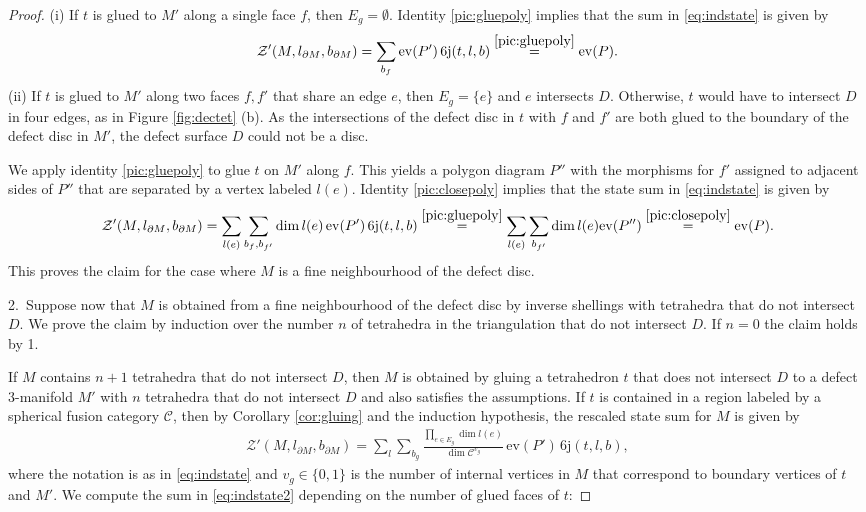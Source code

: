 \documentclass[1.5pt, a4paper]{article}
\newcommand{\mac}{\mathcal C}
\newcommand{\ev}{\mathrm{ev}}
\begin{document}
\begin{proof}
 (i) If $t$ is glued to $M'$ along a single face $f$, then $E_g=\emptyset$.  
Identity \eqref{pic:gluepoly}  implies that the sum in \eqref{eq:indstate} is given by
$$\mathcal Z'(M, l_{\partial M}, b_{\partial M})=\sum_{b_f} \ev(P')\, \mathrm{6j}(t,l,b)\stackrel{\eqref{pic:gluepoly}}=\ev(P).$$
(ii) If $t$ is glued to $M'$ along two faces $f,f'$ that share an edge $e$, then $E_g=\{e\}$ and $e$ intersects $D$.  Otherwise, $t$ would have to intersect 
$D$ in four edges, as in Figure \ref{fig:dectet} (b). As the intersections of the defect disc in $t$ with $f$ and $f'$ are both glued to the boundary of the defect disc in $M'$, 
the defect surface $D$ could not be a disc. 


We apply  identity \eqref{pic:gluepoly}  to 
 glue $t$ on $M'$ along $f$. This yields a polygon diagram $P''$ with the morphisms for $f'$ assigned to adjacent sides of $P''$ that are separated by a vertex labeled $l(e)$. 
Identity \eqref{pic:closepoly} implies that the state sum 
 in \eqref{eq:indstate} is given by
$$
\mathcal Z'(M, l_{\partial M}, b_{\partial M})=\sum_{l(e)} \sum_{b_f, b_{f'}} \dim l(e)\, \ev(P')\, \mathrm{6j}(t,l,b)\stackrel{\eqref{pic:gluepoly}}=\sum_{l(e)} \sum_{b_{f'}} \dim l(e) \ev(P'') \stackrel{\eqref{pic:closepoly}}=\ev(P).
$$
This proves the claim for the case where $M$ is a fine neighbourhood of the defect disc.

2.~Suppose now that $M$ is obtained from a fine neighbourhood of the defect disc by inverse shellings with tetrahedra that do not intersect $D$. We prove the claim by induction over the number $n$ of tetrahedra in the triangulation that  do not intersect $D$. If $n=0$ the claim holds by 1.  

If $M$ contains $n+1$ tetrahedra that do not intersect $D$, then $M$ is obtained by gluing a tetrahedron $t$ that does not intersect $D$ to a defect 3-manifold $M'$ with $n$ tetrahedra that do not intersect $D$ and also satisfies the assumptions. If $t$  is contained in a region labeled by a spherical fusion category  $\mac$, then 
by Corollary \ref{cor:gluing} and the induction hypothesis, the rescaled state sum for $M$ is  given by
\begin{align}\label{eq:indstate2}
\mathcal Z'(M, l_{\partial M}, b_{\partial M})=
\sum_{l}\sum_{b_g}
\frac{ \prod_{e\in E_g} \dim l(e)}{\dim \mac^{v_g}}\, \ev(P')\, \mathrm{6j}(t,l,b),
\end{align}
where the notation is as in \eqref{eq:indstate} and $v_g\in\{0,1\}$ is the number of internal vertices in $M$ that correspond to boundary vertices of $t$ and $M'$.
We  compute the sum in \eqref{eq:indstate2} depending on the number of glued faces of $t$:


\end{proof}
\end{document}
